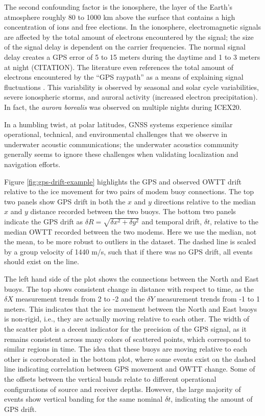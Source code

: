 The second confounding factor is the ionosphere, the layer of the Earth's atmosphere roughly 80 to 1000 km above the surface that contains a high concentration of ions and free elections. 
In the ionosphere, electromagnetic signals are affected by the total amount of electrons encountered by the signal; the size of the signal delay is dependent on the carrier frequencies.
The normal signal delay creates a GPS error of 5 to 15 meters during the daytime and 1 to 3 meters at night (CITATION).
The literature even references the total amount of electrons encountered by the ``GPS raypath'' as a means of explaining signal fluctuations \citep{themens_nature_2015}.
This variability is observed by seasonal and solar cycle variabilities,\citep{themens_nature_2015} severe ionospheric storms\citep{mitchell_gps_2005}, and auroral activity (increased electron precipitation)\citep{jin_gps_2014,gwal_gps_2011}.
In fact, the \textit{aurora borealis} was observed on multiple nights during ICEX20.

In a humbling twist, at polar latitudes, GNSS systems experience similar operational, technical, and environmental challenges that we observe in underwater acoustic communications; the underwater acoustics community generally seems to ignore these challenges when validating localization and navigation efforts.

Figure \ref{fig:gps-drift-example} highlights the GPS and observed OWTT drift relative to the ice movement for two pairs of modem buoy connections.
The top two panels show GPS drift in both the $x$ and $y$ directions relative to the median $x$ and $y$ distance recorded between the two buoys.
The bottom two panels indicate the GPS drift as $\delta R = \sqrt{\delta x^2 + \delta y^2}$ and temporal drift, $\delta t$, relative to the median OWTT recorded between the two modems.
Here we use the median, not the mean, to be more robust to outliers in the dataset.
The dashed line is scaled by a group velocity of 1440 m/s, such that if there was no GPS drift, all events should exist on the line.

The left hand side of the plot shows the connections between the North and East buoys.
The top shows consistent change in distance with respect to time, as the $\delta X$ measurement trends from 2 to -2 and the $\delta Y$ measurement trends from -1 to 1 meters.
This indicates that the ice movement between the North and East buoys is non-rigid, i.e., they are actually moving relative to each other.
The width of the scatter plot is a decent indicator for the precision of the GPS signal, as it remains consistent across many colors of scattered points, which correspond to similar regions in time.
The idea that these buoys are moving relative to each other is corroborated in the bottom plot, where some events exist on the dashed line indicating correlation between GPS movement and OWTT change.
Some of the offsets between the vertical bands relate to different operational configurations of source and receiver depths.
However, the large majority of events show vertical banding for the same nominal $\delta t$, indicating the amount of GPS drift.

